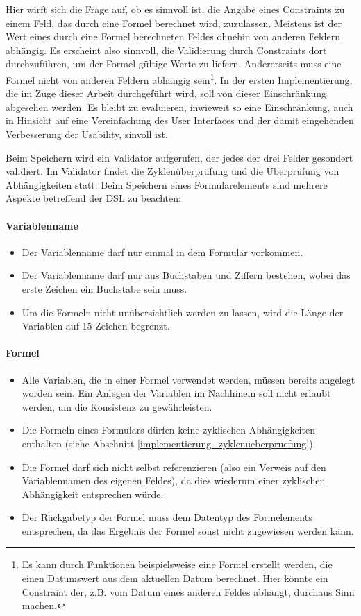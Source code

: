 Hier wirft sich die Frage auf, ob es sinnvoll ist, die Angabe eines Constraints zu einem Feld, das durch eine Formel berechnet wird, zuzulassen. Meistens ist der Wert eines durch eine Formel berechneten Feldes ohnehin von anderen Feldern abhängig. Es erscheint also sinnvoll, die Validierung durch Constraints dort durchzuführen, um der Formel gültige Werte zu liefern. Andererseits muss eine Formel nicht von anderen Feldern abhängig sein\footnote{{Es kann durch Funktionen beispielsweise eine Formel erstellt werden, die einen Datumswert aus dem aktuellen Datum berechnet. Hier könnte ein Constraint der, z.B. vom Datum eines anderen Feldes abhängt, durchaus Sinn machen.}}. In der ersten Implementierung, die im Zuge dieser Arbeit durchgeführt wird, soll von dieser Einschränkung abgesehen werden. Es bleibt zu evaluieren, inwieweit so eine Einschränkung, auch in Hinsicht auf eine Vereinfachung des User Interfaces und der damit eingehenden Verbesserung der Usability, sinvoll ist.

Beim Speichern wird ein Validator aufgerufen, der jedes der drei Felder gesondert validiert. Im Validator findet die Zyklenüberprüfung und die Überprüfung von Abhängigkeiten statt. Beim Speichern eines Formularelements sind mehrere Aspekte betreffend der DSL zu beachten:

\paragraph{Variablenname}
\begin{itemize}
	\item Der Variablenname darf nur einmal in dem Formular vorkommen.
	\item Der Variablenname darf nur aus Buchstaben und Ziffern bestehen, wobei das erste Zeichen ein Buchstabe sein muss.
	\item Um die Formeln nicht unübersichtlich werden zu lassen, wird die Länge der Variablen auf 15 Zeichen begrenzt.
\end{itemize}

\paragraph{Formel}
\begin{itemize}
	\item Alle Variablen, die in einer Formel verwendet werden, müssen bereits angelegt worden sein. Ein Anlegen der Variablen im Nachhinein soll nicht erlaubt werden, um die Konsistenz zu gewährleisten.
	\item Die Formeln eines Formulars dürfen keine zyklischen Abhängigkeiten enthalten (siehe Abschnitt \ref{implementierung_zyklenueberpruefung}).
	\item Die Formel darf sich nicht selbst referenzieren (also ein Verweis auf den Variablennamen des eigenen Feldes), da dies wiederum einer zyklischen Abhängigkeit entsprechen würde.
	\item Der Rückgabetyp der Formel muss dem Datentyp des Formelements entsprechen, da das Ergebnis der Formel sonst nicht zugewiesen werden kann.
\end{itemize}

